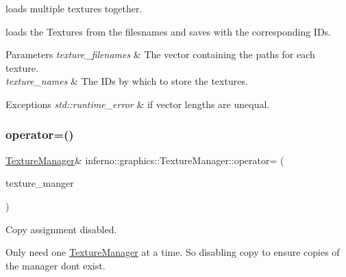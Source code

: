 loads multiple textures together. 

loads the Textures from the filesnames and saves with the corresponding I\+Ds. 
\begin{DoxyParams}{Parameters}
{\em texture\+\_\+filenames} & The vector containing the paths for each texture. \\
\hline
{\em texture\+\_\+names} & The I\+Ds by which to store the textures. \\
\hline
\end{DoxyParams}

\begin{DoxyExceptions}{Exceptions}
{\em std\+::runtime\+\_\+error} & if vector lengths are unequal. \\
\hline
\end{DoxyExceptions}
\mbox{\label{classinferno_1_1graphics_1_1_texture_manager_a328ab24dd273a41437c23abafbf978c0}} 
\subsubsection{\texorpdfstring{operator=()}{operator=()}\hspace{0.1cm}{\footnotesize\ttfamily [1/2]}}
{\footnotesize\ttfamily \mbox{\hyperlink{classinferno_1_1graphics_1_1_texture_manager}{Texture\+Manager}}\& inferno\+::graphics\+::\+Texture\+Manager\+::operator= (\begin{DoxyParamCaption}\item[{const \mbox{\hyperlink{classinferno_1_1graphics_1_1_texture_manager}{Texture\+Manager}} \&}]{texture\+\_\+manger }\end{DoxyParamCaption})\hspace{0.3cm}{\ttfamily [delete]}}



Copy assignment disabled. 

Only need one \mbox{\hyperlink{classinferno_1_1graphics_1_1_texture_manager}{Texture\+Manager}} at a time. So disabling copy to ensure copies of the manager don\textquotesingle{}t exist. \mbox{\label{classinferno_1_1graphics_1_1_texture_manager_ac413011a070590a960995b21eb4e3fdb}} 
